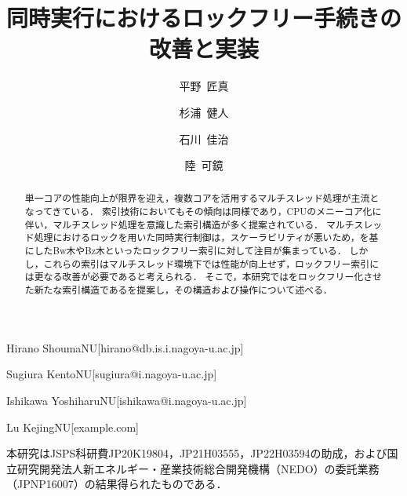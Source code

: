 \documentclass[
  submit,
  techrep,
  noauthor,
  a4paper,
  notitlepage,
  ja=standard,
  autodetect-engine,
  dvi=dvipdfmx
]{ipsj}
\begin{document}
\title{同時実行\Bptree{}におけるロックフリー手続きの改善と実装}


\author{平野~匠真}{Hirano Shouma}{NU}[hirano@db.is.i.nagoya-u.ac.jp]
\author{杉浦~健人}{Sugiura Kento}{NU}[sugiura@i.nagoya-u.ac.jp]
\author{石川~佳治}{Ishikawa Yoshiharu}{NU}[ishikawa@i.nagoya-u.ac.jp]
\author{陸~可鏡}{Lu Kejing}{NU}[example.com]

\begin{abstract}
  単一コアの性能向上が限界を迎え，複数コアを活用するマルチスレッド処理が主流となってきている．
  索引技術においてもその傾向は同様であり，CPUのメニーコア化に伴い，マルチスレッド処理を意識した索引構造が多く提案されている．
  マルチスレッド処理におけるロックを用いた同時実行制御は，スケーラビリティが悪いため，\Bptree{}を基にしたBw木やBz木といったロックフリー索引に対して注目が集まっている．
  しかし，これらの索引はマルチスレッド環境下では性能が向上せず，ロックフリー索引には更なる改善が必要であると考えられる．
  そこで，本研究では\Bptree{}をロックフリー化させた新たな索引構造である\Bctree{}を提案し，その構造および操作について述べる．
\end{abstract}

\maketitle



\begin{acknowledgment}
  本研究はJSPS科研費JP20K19804，JP21H03555，JP22H03594の助成，および国立研究開発法人新エネルギー・産業技術総合開発機構（NEDO）の委託業務（JPNP16007）の結果得られたものである．
\end{acknowledgment}



\end{document}
